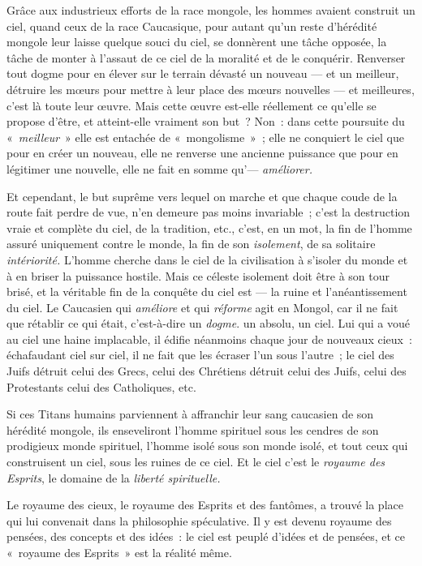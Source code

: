 \documentclass[french,twoside]{book} %
\begin{document}
Grâce aux industrieux efforts de la race mongole, les hommes avaient construit un ciel, quand ceux de la race Caucasique, pour autant qu’un reste d’hérédité mongole leur laisse quelque souci du ciel, se donnèrent une tâche opposée, la tâche de monter à l’assaut de ce ciel de la moralité et de le conquérir. Renverser tout dogme pour en élever sur le terrain dévasté un nouveau — et un meilleur, détruire les mœurs pour mettre à leur place des mœurs nouvelles — et meilleures, c’est là toute leur œuvre. Mais cette œuvre est-elle réellement ce qu’elle se propose d’être, et atteint-elle vraiment son but ? Non : dans cette poursuite du « \emph{meilleur} » elle est entachée de « mongolisme » ; elle ne conquiert le ciel que pour en créer un nouveau, elle ne renverse une ancienne puissance que pour en légitimer une nouvelle, elle ne fait en somme qu’— \emph{améliorer.}\par
Et cependant, le but suprême vers lequel on marche et que chaque coude de la route fait perdre de vue, n’en demeure pas moins invariable ; c’est la destruction vraie et complète du ciel, de la tradition, etc., c’est, en un mot, la fin de l’homme assuré uniquement contre le monde, la fin de son \emph{isolement}, de sa solitaire  \emph{intériorité.} L’homme cherche dans le ciel de la civilisation à s’isoler du monde et à en briser la puissance hostile. Mais ce céleste isolement doit être à son tour brisé, et la véritable fin de la conquête du ciel est — la ruine et l’anéantissement du ciel. Le Caucasien qui \emph{améliore} et qui \emph{réforme} agit en Mongol, car il ne fait que rétablir ce qui était, c’est-à-dire un \emph{dogme}. un absolu, un ciel. Lui qui a voué au ciel une haine implacable, il édifie néanmoins chaque jour de nouveaux cieux : échafaudant ciel sur ciel, il ne fait que les écraser l’un sous l’autre ; le ciel des Juifs détruit celui des Grecs, celui des Chrétiens détruit celui des Juifs, celui des Protestants celui des Catholiques, etc.\par
Si ces Titans humains parviennent à affranchir leur sang caucasien de son hérédité mongole, ils enseveliront l’homme spirituel sous les cendres de son prodigieux monde spirituel, l’homme isolé sous son monde isolé, et tout ceux qui construisent un ciel, sous les ruines de ce ciel. Et le ciel c’est le \emph{royaume des Esprits}, le domaine de la \emph{liberté spirituelle.}\par
Le royaume des cieux, le royaume des Esprits et des fantômes, a trouvé la place qui lui convenait dans la philosophie spéculative. Il y est devenu royaume des pensées, des concepts et des idées : le ciel est peuplé d’idées et de pensées, et ce « royaume des Esprits » est la réalité même.\par
\end{document}
